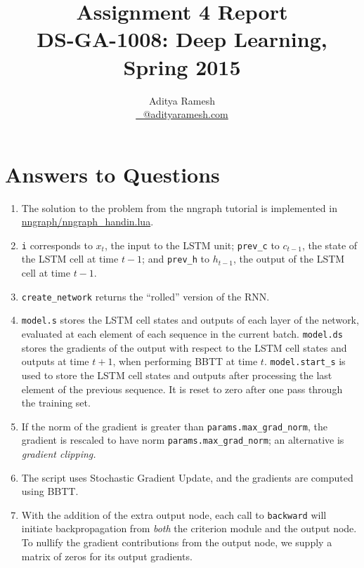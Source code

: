 \documentclass[11pt,a4paper]{article}
\title{Assignment 4 Report \\ DS-GA-1008: Deep Learning, Spring 2015}
\author{Aditya Ramesh \\ \url{_@adityaramesh.com}}
\begin{document}
\maketitle

\section{Answers to Questions}

\begin{enumerate}
\item The solution to the problem from the \textsf{nngraph} tutorial is
implemented in \url{nngraph/nngraph_handin.lua}.

\item \lstinline{i} corresponds to $x_t$, the input to the LSTM unit;
\lstinline{prev_c} to $c_{t - 1}$, the state of the LSTM cell at time $t - 1$;
and \lstinline{prev_h} to $h_{t - 1}$, the output of the LSTM cell at time $t -
1$.

\item \lstinline{create_network} returns the ``rolled'' version of the RNN.

\item \lstinline{model.s} stores the LSTM cell states and outputs of each layer
of the network, evaluated at each element of each sequence in the current batch.
\lstinline{model.ds} stores the gradients of the output with respect to the LSTM
cell states and outputs at time $t + 1$, when performing BBTT at time $t$.
\lstinline{model.start_s} is used to store the LSTM cell states and outputs
after processing the last element of the previous sequence. It is reset to zero
after one pass through the training set.

\item If the norm of the gradient is greater than
\lstinline{params.max_grad_norm}, the gradient is rescaled to have norm
\lstinline{params.max_grad_norm}; an alternative is \emph{gradient clipping.}

\item The script uses Stochastic Gradient Update, and the gradients are computed
using BBTT.

\item With the addition of the extra output node, each call to
\lstinline{backward} will initiate backpropagation from \emph{both} the
criterion module and the output node. To nullify the gradient contributions from
the output node, we supply a matrix of zeros for its output gradients.
\end{enumerate}
\end{document}
